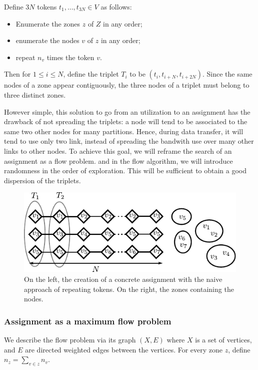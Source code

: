 \documentclass[]{article}
\begin{document}
Define $3N$ tokens $t_1,\ldots, t_{3N}\in V$ as follows:
\begin{itemize}
	\item Enumerate the zones $z$ of $Z$ in any order;
	\item enumerate the nodes $v$ of $z$ in any order;
	\item repeat $n_v$ times the token $v$.
\end{itemize} 
Then for $1\le i \le N$, define the triplet $T_i$ to be 
$(t_i, t_{i+N}, t_{i+2N})$. Since the same nodes of a zone appear contiguously, the three nodes of a triplet must belong to three distinct zones.

However simple, this solution to go from an utilization to an assignment has the drawback of not spreading the triplets: a node will tend to be associated to the same two other nodes for many partitions. Hence, during data transfer, it will tend to use only two link, instead of spreading the bandwith use over many other links to other nodes. To achieve this goal, we will reframe the search of an assignment as a flow problem. and in the flow algorithm, we will introduce randomness in the order of exploration. This will be sufficient to obtain a good dispersion of the triplets.

\begin{figure}
	\centering
	\includegraphics[width=0.9\linewidth]{figures/naive}
	\caption{On the left, the creation of a concrete assignment with the naive approach of repeating tokens. On the right, the zones containing the nodes.}
\end{figure}

\subsubsection*{Assignment as a maximum flow problem}

We describe the flow problem via its graph $(X,E)$ where $X$ is a set of vertices, and $E$ are directed weighted edges between the vertices. For every zone $z$, define $n_z=\sum_{v\in z} n_v$.
\end{document}
